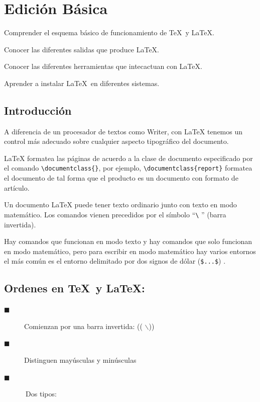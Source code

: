 \chapter{Edici\'{o}n B\'{a}sica}
\chaptertoc 
\begin{objetivos}
\begin{lista}
\item Comprender el esquema básico de funcionamiento de \TeX\, y \LaTeX .
\item Conocer las diferentes salidas que produce \LaTeX.
\item Conocer las diferentes herramientas que intecactuan con \LaTeX.
\item Aprender a instalar \LaTeX\, en diferentes sistemas.
\end{lista}
\end{objetivos}
\section{Introducción}

A diferencia de un procesador de textos como Writer, con \LaTeX{}
tenemos un control más adecuado sobre cualquier aspecto tipográfico
del documento. 

\LaTeX{} formatea las páginas de acuerdo a la clase de documento especificado
por el comando \lstinline+\documentclass{}+, por ejemplo, \lstinline+\documentclass{report}+
formatea el documento de tal forma que el producto es un documento
con formato de artículo. 

Un documento \LaTeX{} puede tener texto ordinario junto con texto
en modo matemático. Los comandos vienen precedidos por el símbolo
“\lstinline+\+ ” (barra invertida).

Hay comandos que funcionan en modo texto y hay comandos que solo funcionan
en modo matemático, pero para escribir en modo matemático hay varios
entornos el más común es el entorno delimitado por dos signos de dólar
(\lstinline+$...$+) .
\section{Ordenes en  \TeX\, y  \LaTeX:}

\begin{description}
\item[$\blacksquare$] Comienzan por una barra invertida: 
(( $\backslash$))

\item[$\blacksquare$] Distinguen may\'{u}sculas y min\'{u}sculas

\item[$\blacksquare$] $\ $Dos tipos:
\end{description}

